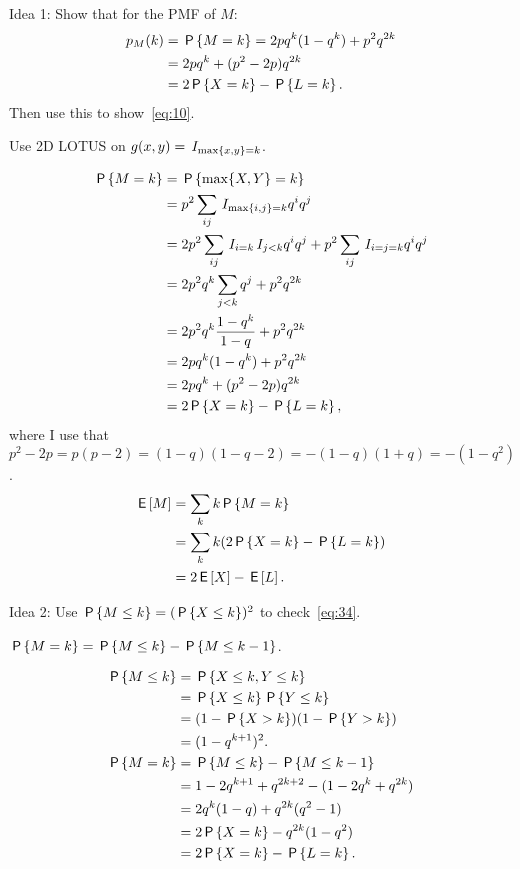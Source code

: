 \documentclass[a4paper,11pt]{article}
\renewcommand{\max}[1]{\mathrm{max}\{#1\}}
\begin{document}
\begin{exercise}\label{ex:1}
Idea 1: Show that for the PMF of $M$:
\begin{align}
p_M(k) &= \P{M=k} = 2 pq^{k}(1-q^{k}) + p^2q^{2k} \\
&=2 pq^{k} +(p^{2}-2p) q^{2k} \label{eq:18}\\
&=2 \P{X=k} - \P{L=k}. \label{eq:34}
\end{align}
Then use this to show~\cref{eq:10}.
\begin{hint}
  Use 2D LOTUS on $g(x,y) = \1{\max{x, y} = k}$.
\end{hint}
\begin{solution}
  \begin{align}
    \label{eq:14}
\P{M=k}
&= \P{\max{X, Y} = k} \\
&=p^{2}\sum_{ij}\1{\max{i,j} =k} q^i q^j\\
&=2 p^{2}\sum_{ij}\1{i=k}\1{j < k} q^i q^j + p^{2}\sum_{ij}\1{i=j=k} q^{i} q^j \\
&=2 p^{2}q^{k}\sum_{j < k} q^j + p^{2}q^{2k}\\
&=2 p^{2}q^{k}\frac{1-q^{k}}{1-q} +  p^{2}q^{2k}\\
&=2 pq^{k}(1-q^{k}) + p^{2}q^{2k}\\
&=2 pq^{k} +(p^{2}-2p) q^{2k} \label{eq:18}\\
&=2 \P{X=k} - \P{L=k},
  \end{align}
where I use that $p^{2}-2p = p(p-2) = (1-q)(1-q-2)=-(1-q)(1+q)=-(1-q^{2})$.
  \begin{align}
    \label{eq:15}
\E M
&= \sum_k k \P{M=k}     \\
&=  \sum_{k}k (2\P{X=k} - \P{L=k}) \\
&= 2 \E X  - \E L.
  \end{align}
\end{solution}
\end{exercise}

\begin{exercise}
Idea 2: Use  $\P{M\leq k} = (\P{X\leq k})^{2}$  to check~\cref{eq:34}.
\begin{hint}
$\P{M=k} = \P{M\leq k} - \P{M\leq k-1}$.
\end{hint}
\begin{solution}
  \begin{align}
    \label{eq:16}
\P{M\leq k}
&= \P{X\leq k, Y\leq k} \\
&= \P{X\leq k}\P{Y\leq k} \\
&= (1-\P{X> k})(1-\P{Y> k}) \\
&= (1-q^{k+1})^{2}.\\
\P{M=k} &= \P{M\leq k} - \P{M\leq k-1}\\
&= 1-2 q^{k+1} + q^{2k+2} - (1 - 2q^{k} + q^{2k})\\
&= 2 q^{k}(1-q) + q^{2k}(q^{2}-1) \\
&= 2 \P{X=k}  - q^{2k}(1-q^{2}) \\
&= 2 \P{X=k}  - \P{L=k}.
  \end{align}
\end{solution}
\end{exercise}
\end{document}

